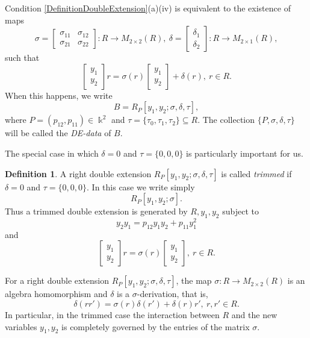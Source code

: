 \documentclass{amsart}
\theoremstyle{definition}
\newtheorem{definition}[theorem]{Definition}
\theoremstyle{remark}
\numberwithin{equation}{section}
\begin{document}
Condition \ref{DefinitionDoubleExtension}(a)(iv) is equivalent to the existence of maps
\[
\sigma=
\begin{bmatrix}
\sigma_{11} & \sigma_{12}\\
\sigma_{21} & \sigma_{22}
\end{bmatrix}:R\to M_{2\times 2}(R),
\
\delta=
\begin{bmatrix}
\delta_1\\
\delta_2
\end{bmatrix}:R\to M_{2\times 1}(R),
\]
such that
\begin{equation}\label{MatrixRelationDoubleExtension}
\begin{bmatrix}
y_1\\
y_2
\end{bmatrix}r
=
\sigma(r)
\begin{bmatrix}
y_1\\
y_2
\end{bmatrix}
+
\delta(r),
\ r\in R.
\end{equation}
When this happens, we write
\[
B=R_P[y_1,y_2;\sigma,\delta,\tau],
\]
where $P=(p_{12},p_{11})\in\Bbbk^2$ and $\tau=\{\tau_0,\tau_1,\tau_2\}\subseteq R$. The collection $\{P,\sigma,\delta,\tau\}$ will be called the \emph{DE-data} of $B$.

The special case in which $\delta=0$ and $\tau=\{0,0,0\}$ is particularly important for us.

\begin{definition}\label{DefinitionTrimmedDoubleExtension}
A right double extension $R_P[y_1,y_2;\sigma,\delta,\tau]$ is called \emph{trimmed} if $\delta=0$ and $\tau=\{0,0,0\}$. In this case we write simply
\[
R_P[y_1,y_2;\sigma].
\]
Thus a trimmed double extension is generated by $R,y_1,y_2$ subject to
\[
y_2y_1=p_{12}y_1y_2+p_{11}y_1^2
\]
and
\[
\begin{bmatrix}
y_1\\
y_2
\end{bmatrix}r
=
\sigma(r)
\begin{bmatrix}
y_1\\
y_2
\end{bmatrix},
\ r\in R.
\]
\end{definition}

For a right double extension $R_P[y_1,y_2;\sigma,\delta,\tau]$, the map $\sigma:R\to M_{2\times 2}(R)$ is an algebra homomorphism and $\delta$ is a $\sigma$-derivation, that is,
\[
\delta(rr')=\sigma(r)\delta(r')+\delta(r)r',
\ r,r'\in R.
\]
In particular, in the trimmed case the interaction between $R$ and the new variables $y_1,y_2$ is completely governed by the entries of the matrix $\sigma$.
\end{document}
